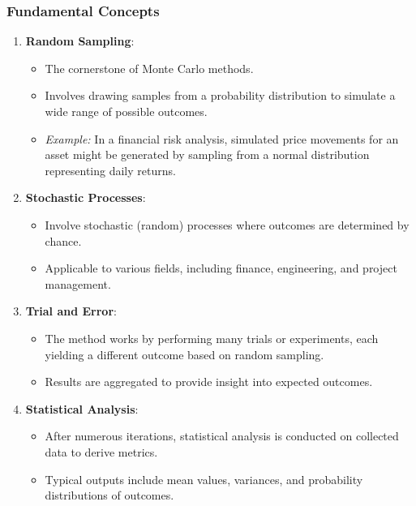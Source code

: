 \documentclass[aspectratio=169]{beamer}
\begin{document}
\begin{frame}[fragile]
  \frametitle{Fundamental Concepts}
  \begin{enumerate}
    \item \textbf{Random Sampling}:
      \begin{itemize}
        \item The cornerstone of Monte Carlo methods.
        \item Involves drawing samples from a probability distribution to simulate a wide range of possible outcomes.
        \item \textit{Example:} In a financial risk analysis, simulated price movements for an asset might be generated by sampling from a normal distribution representing daily returns.
      \end{itemize}
      
    \item \textbf{Stochastic Processes}:
      \begin{itemize}
        \item Involve stochastic (random) processes where outcomes are determined by chance.
        \item Applicable to various fields, including finance, engineering, and project management.
      \end{itemize}

    \item \textbf{Trial and Error}:
      \begin{itemize}
        \item The method works by performing many trials or experiments, each yielding a different outcome based on random sampling.
        \item Results are aggregated to provide insight into expected outcomes.
      \end{itemize}

    \item \textbf{Statistical Analysis}:
      \begin{itemize}
        \item After numerous iterations, statistical analysis is conducted on collected data to derive metrics.
        \item Typical outputs include mean values, variances, and probability distributions of outcomes.
      \end{itemize}
  \end{enumerate}
\end{frame}
\end{document}
